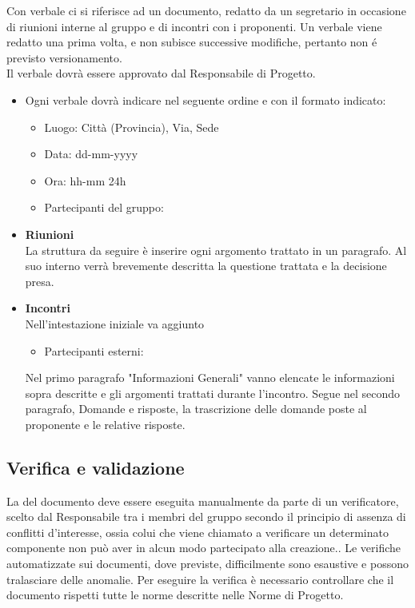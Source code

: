 	\label{verbale}
	Con verbale ci si riferisce ad un documento, redatto da un segretario in occasione  di riunioni interne al gruppo e di incontri con i proponenti. Un verbale viene redatto una prima volta, e non subisce successive modifiche, pertanto non é previsto versionamento. \\
	Il verbale dovrà essere approvato dal Responsabile di Progetto.
	\begin{itemize}
	\item Ogni verbale dovrà indicare nel seguente ordine e con il formato indicato:
	
	
	\begin{itemize}
	\item Luogo: Città (Provincia), Via, Sede
	\item Data: dd-mm-yyyy
	\item Ora: hh-mm 24h
	\item Partecipanti del gruppo:
	\end{itemize}
	
	\item \textbf{Riunioni} \\
	La struttura da seguire è inserire ogni argomento trattato in un paragrafo. Al suo interno verrà brevemente descritta la questione trattata e la decisione presa.
	
	\item \textbf{Incontri} \\
	Nell'intestazione iniziale va aggiunto
	\begin{itemize}
	\item Partecipanti esterni:
	\end{itemize}
	Nel primo paragrafo "Informazioni Generali" vanno elencate le informazioni sopra descritte e gli argomenti trattati durante l'incontro. Segue nel secondo paragrafo, Domande e risposte, la trascrizione delle domande poste al proponente e le relative risposte.
	\end{itemize}
	
\subsection{Verifica e validazione}

La \textbf{} del documento deve essere eseguita manualmente da parte di un verificatore, scelto dal Responsabile tra i membri del gruppo secondo il principio di assenza di conflitti d'interesse, ossia colui che viene chiamato a verificare un determinato componente non può aver in alcun modo partecipato alla creazione.. Le verifiche automatizzate sui documenti, dove previste, difficilmente sono esaustive e possono tralasciare delle anomalie. Per eseguire la verifica è necessario controllare che il documento rispetti tutte le norme descritte nelle Norme di Progetto.

